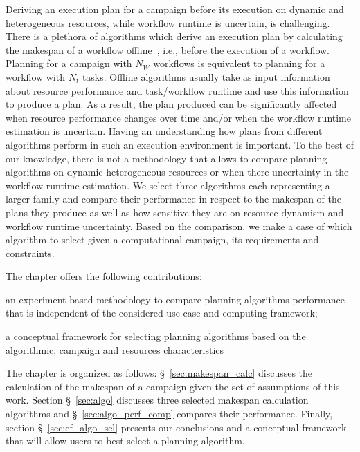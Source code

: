 Deriving an execution plan for a campaign before its execution on dynamic and heterogeneous resources, while workflow runtime is uncertain, is challenging.
There is a plethora of algorithms which derive an execution plan by calculating the makespan of a workflow offline~\cite{lu2019review}, i.e., before the execution of a workflow.
Planning for a campaign with $N_W$ workflows is equivalent to planning for a workflow with $N_t$ tasks.
Offline algorithms usually take as input information about resource performance and task/workflow runtime and use this information to produce a plan.
As a result, the plan produced can be significantly affected when resource performance changes over time and/or when the workflow runtime estimation is uncertain.
Having an understanding how plans from different algorithms perform in such an execution environment is important.
To the best of our knowledge, there is not a methodology that allows to compare planning algorithms on dynamic heterogeneous resources or when there uncertainty in the workflow runtime estimation.
We select three algorithms each representing a larger family and compare their performance in respect to the makespan of the plans they produce as well as how sensitive they are on resource dynamism and workflow runtime uncertainty.
Based on the comparison, we make a case of which algorithm to select given a computational campaign, its requirements and constraints.

The chapter offers the following contributions:
\begin{inparaenum}[i)]
    \item an experiment-based methodology to compare planning algorithms performance that is independent of the considered use case and computing framework;
    \item a conceptual framework for selecting planning algorithms based on the algorithmic, campaign and resources characteristics
\end{inparaenum}

The chapter is organized as follows: \S~\ref{sec:makespan_calc} discusses the calculation of the makespan of a campaign given the set of assumptions of this work.
Section \S~\ref{sec:algo} discusses three selected makespan calculation algorithms and \S~\ref{sec:algo_perf_comp} compares their performance.
Finally, section \S~\ref{sec:cf_algo_sel} presents our conclusions and a conceptual framework that will allow users to best select a planning algorithm.

